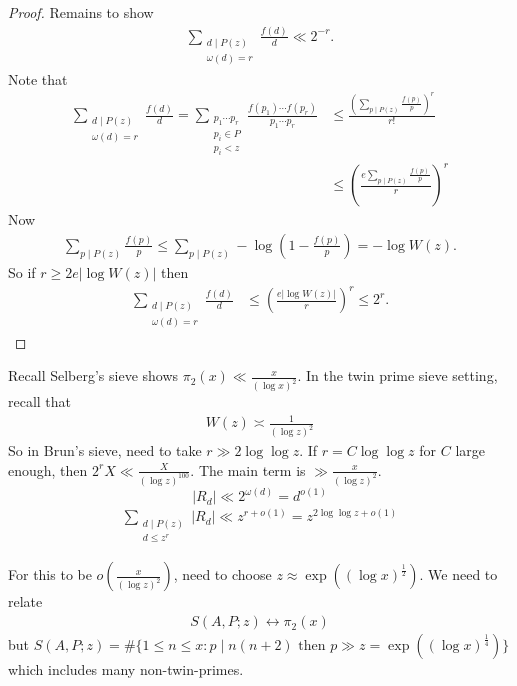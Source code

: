 \documentclass{article}
\newcommand{\1}{\mathbbm{1}}
\begin{document}
\begin{proof}
  Remains to show
  \begin{align*}
    \sum_{\substack{d \mid P(z) \\ \omega(d) = r}} \frac{f(d)}{d} \ll 2^{-r}.
  \end{align*}
  Note that
  \begin{align*}
    \sum_{\substack{d \mid P(z) \\ \omega(d) = r}} \frac{f(d)}{d} = \sum_{\substack{p_1 \dotsm p_r \\ p_i \in P \\ p_i < z}} \frac{f(p_1) \dotsm f(p_r)}{p_1 \dotsm p_r} &\leq \frac{\left(\sum_{p \mid P(z)} \frac{f(p)}{p}\right)^r}{r!} \\
                                                                                                                                                                         &\leq \left(\frac{e \sum_{p \mid P(z)} \frac{f(p)}{p}}{r}\right)^r
  \end{align*}
  Now
  \begin{align*}
    \sum_{p \mid P(z)} \frac{f(p)}{p} \leq \sum_{p \mid P(z)} - \log\left(1 - \frac{f(p)}{p}\right) = - \log W(z).
  \end{align*}
  So if $r \geq 2 e |\log W(z)|$ then
  \begin{align*}
    \sum_{\substack{d \mid P(z) \\ \omega(d) = r}} \frac{f(d)}{d}&\leq \left(\frac{e |\log W(z)|}{r}\right)^r \leq 2^r.
  \end{align*}
\end{proof}

Recall Selberg's sieve shows $\pi_2(x) \ll \frac{x}{(\log x)^2}$.
In the twin prime sieve setting, recall that
\begin{align*}
  W(z) \asymp \frac{1}{(\log z)^2}
\end{align*}
So in Brun's sieve, need to take $r \gg 2 \log \log z$.
If $r = C \log \log z$ for $C$ large enough, then $2^r X \ll \frac{X}{(\log z)^{100}}$.
The main term is $\gg \frac{x}{(\log z)^2}$.
\begin{equation*}
  |R_d| \ll 2^{\omega(d)} = d^{o(1)}
\end{equation*}
\begin{align*}
  \sum_{\substack{d \mid P(z) \\ d \leq z^r}} |R_d| \ll z^{r + o(1)} = z^{2 \log \log z + o(1)}
\end{align*}

For this to be $o(\frac{x}{(\log z)^2})$, need to choose $z \approx \exp((\log x)^{\frac 12})$.
We need to relate
\begin{align*}
  S(A,P;z) \leftrightarrow \pi_2(x)
\end{align*}
but $S(A,P;z) = \#\{1 \leq n \leq x : p \mid n(n+2) \text{ then } p \gg z = \exp((\log x)^{\frac 14})\}$
which includes many non-twin-primes.
\end{document}
